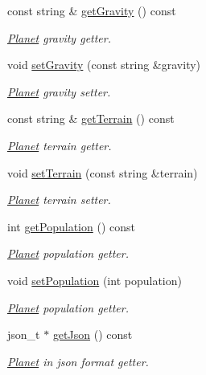 \begin{DoxyCompactItemize}
const string \& \hyperlink{class_planet_ac5a05abfcc0f5dfd23b2787711d7d0e0}{get\+Gravity} () const
\begin{DoxyCompactList}\small\item\em \hyperlink{class_planet}{Planet} gravity getter. \end{DoxyCompactList}\item 
void \hyperlink{class_planet_a47d2253e276b9fcf41422b67f7ed0646}{set\+Gravity} (const string \&gravity)
\begin{DoxyCompactList}\small\item\em \hyperlink{class_planet}{Planet} gravity setter. \end{DoxyCompactList}\item 
const string \& \hyperlink{class_planet_a418c3e489845a9098397b8fb5613a5c1}{get\+Terrain} () const
\begin{DoxyCompactList}\small\item\em \hyperlink{class_planet}{Planet} terrain getter. \end{DoxyCompactList}\item 
void \hyperlink{class_planet_a797a4e0d4af91723bde31e42c5139eab}{set\+Terrain} (const string \&terrain)
\begin{DoxyCompactList}\small\item\em \hyperlink{class_planet}{Planet} terrain setter. \end{DoxyCompactList}\item 
int \hyperlink{class_planet_aad9d8d1f969bdc086f8983cb31cb351f}{get\+Population} () const
\begin{DoxyCompactList}\small\item\em \hyperlink{class_planet}{Planet} population getter. \end{DoxyCompactList}\item 
void \hyperlink{class_planet_a83d383c179b3254cb7a525b824da5b98}{set\+Population} (int population)
\begin{DoxyCompactList}\small\item\em \hyperlink{class_planet}{Planet} population getter. \end{DoxyCompactList}\item 
json\+\_\+t $\ast$ \hyperlink{class_planet_accd08efab6917edf989c379b71829c21}{get\+Json} () const
\begin{DoxyCompactList}\small\item\em \hyperlink{class_planet}{Planet} in json format getter. \end{DoxyCompactList}\end{DoxyCompactItemize}


